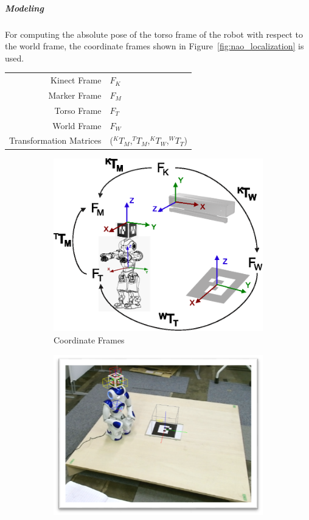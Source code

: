 \subparagraph{Modeling}
For computing the absolute pose of the torso frame of the robot with respect to the world frame, the coordinate frames shown in Figure~\ref{fig:nao_localization} is used.

\begin{tabular}{r l}
\centering
  Kinect Frame & $F_K$ \\ 
  Marker Frame & $F_M$ \\ 
  Torso Frame & $F_T$ \\ 
  World Frame & $F_W$ \\ 
  Transformation Matrices  & ($^{K}T_M$,$^{T}T_M$,$^{K}T_W$,$^{W}T_T$) \\
\end{tabular}

\begin{figure}[H]
\centering
\begin{subfigure}[t]{0.48\textwidth}
\includegraphics[width=\textwidth]{../thesis/assets/localization_concept2.eps}
\caption[Modeling]{Coordinate Frames}
\label{fig:localize_frames}
\end{subfigure}
\begin{subfigure}[t]{0.48\textwidth}
\includegraphics[width=\textwidth]{../thesis/assets/localization_frames.png}

\end{subfigure}
\end{figure}
